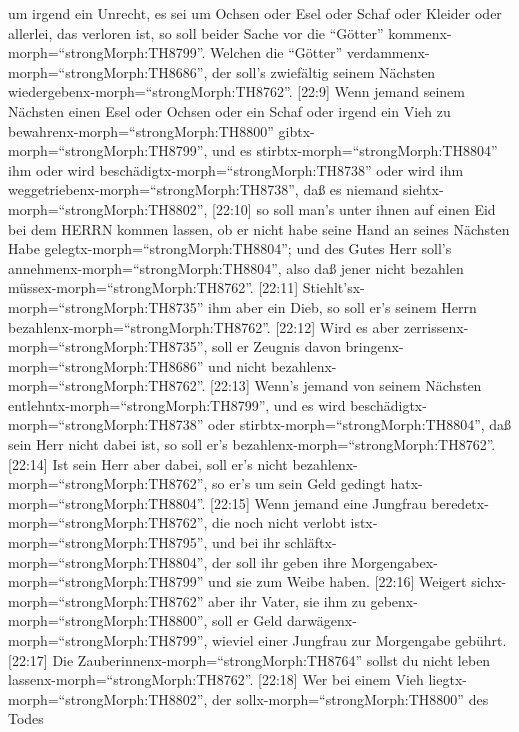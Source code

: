 um irgend ein Unrecht, es sei um Ochsen oder Esel oder Schaf oder
Kleider oder allerlei, das verloren ist, so soll beider Sache vor die
``Götter'' kommenx-morph=``strongMorph:TH8799''. Welchen die ``Götter''
verdammenx-morph=``strongMorph:TH8686'', der soll's zwiefältig seinem
Nächsten wiedergebenx-morph=``strongMorph:TH8762''. 
{[}22:9{]} Wenn jemand seinem Nächsten einen Esel oder Ochsen oder ein
Schaf oder irgend ein Vieh zu bewahrenx-morph=``strongMorph:TH8800''
gibtx-morph=``strongMorph:TH8799'', und es
stirbtx-morph=``strongMorph:TH8804'' ihm oder wird
beschädigtx-morph=``strongMorph:TH8738'' oder wird ihm
weggetriebenx-morph=``strongMorph:TH8738'', daß es niemand
siehtx-morph=``strongMorph:TH8802'',  {[}22:10{]} so soll
man's unter ihnen auf einen Eid bei dem HERRN kommen lassen, ob er nicht
habe seine Hand an seines Nächsten Habe
gelegtx-morph=``strongMorph:TH8804''; und des Gutes Herr soll's
annehmenx-morph=``strongMorph:TH8804'', also daß jener nicht bezahlen
müssex-morph=``strongMorph:TH8762''.  {[}22:11{]}
Stiehlt'sx-morph=``strongMorph:TH8735'' ihm aber ein Dieb, so soll er's
seinem Herrn bezahlenx-morph=``strongMorph:TH8762''. 
{[}22:12{]} Wird es aber zerrissenx-morph=``strongMorph:TH8735'', soll
er Zeugnis davon bringenx-morph=``strongMorph:TH8686'' und nicht
bezahlenx-morph=``strongMorph:TH8762''.  {[}22:13{]} Wenn's
jemand von seinem Nächsten entlehntx-morph=``strongMorph:TH8799'', und
es wird beschädigtx-morph=``strongMorph:TH8738'' oder
stirbtx-morph=``strongMorph:TH8804'', daß sein Herr nicht dabei ist, so
soll er's bezahlenx-morph=``strongMorph:TH8762''. 
{[}22:14{]} Ist sein Herr aber dabei, soll er's nicht
bezahlenx-morph=``strongMorph:TH8762'', so er's um sein Geld gedingt
hatx-morph=``strongMorph:TH8804''.  {[}22:15{]} Wenn jemand
eine Jungfrau beredetx-morph=``strongMorph:TH8762'', die noch nicht
verlobt istx-morph=``strongMorph:TH8795'', und bei ihr
schläftx-morph=``strongMorph:TH8804'', der soll ihr geben ihre
Morgengabex-morph=``strongMorph:TH8799'' und sie zum Weibe haben.
 {[}22:16{]} Weigert sichx-morph=``strongMorph:TH8762''
aber ihr Vater, sie ihm zu gebenx-morph=``strongMorph:TH8800'', soll er
Geld darwägenx-morph=``strongMorph:TH8799'', wieviel einer Jungfrau zur
Morgengabe gebührt.  {[}22:17{]} Die
Zauberinnenx-morph=``strongMorph:TH8764'' sollst du nicht leben
lassenx-morph=``strongMorph:TH8762''.  {[}22:18{]} Wer bei
einem Vieh liegtx-morph=``strongMorph:TH8802'', der
sollx-morph=``strongMorph:TH8800'' des Todes
